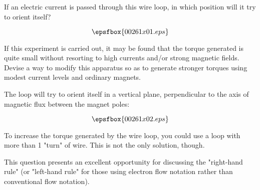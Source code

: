 

If an electric current is passed through this wire loop, in which position will it try to orient itself?

$$\epsfbox{00261x01.eps}$$

If this experiment is carried out, it may be found that the torque generated is quite small without resorting to high currents and/or strong magnetic fields.  Devise a way to modify this apparatus so as to generate stronger torques using modest current levels and ordinary magnets.







The loop will try to orient itself in a vertical plane, perpendicular to the axis of magnetic flux between the magnet poles:

$$\epsfbox{00261x02.eps}$$

To increase the torque generated by the wire loop, you could use a loop with more than 1 "turn" of wire.  This is not the only solution, though.







This question presents an excellent opportunity for discussing the "right-hand rule" (or "left-hand rule" for those using electron flow notation rather than conventional flow notation).



